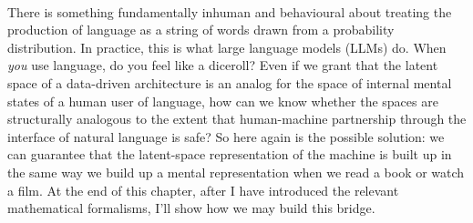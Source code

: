 \\
There is something fundamentally inhuman and behavioural about treating the production of language as a string of words drawn from a probability distribution. In practice, this is what large language models (LLMs) do. When \emph{you} use language, do you feel like a diceroll? Even if we grant that the latent space of a data-driven architecture is an analog for the space of internal mental states of a human user of language, how can we know whether the spaces are structurally analogous to the extent that human-machine partnership through the interface of natural language is safe? So here again is the possible solution: we can guarantee that the latent-space representation of the machine is built up in the same way we build up a mental representation when we read a book or watch a film. At the end of this chapter, after I have introduced the relevant mathematical formalisms, I'll show how we may build this bridge.


